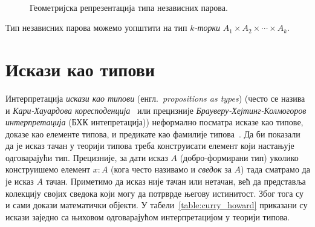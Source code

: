 \documentclass[12pt,oneside]{memoir}
\begin{document}
\begin{figure}[!ht]
    \centering\
    \label{fig:geo_prod}
    \caption{Геометријска репрезентација типа независних парова.}
\end{figure}

Тип независних парова можемо уопштити на тип \emph{$k$-торки} $A_1 \times A_2 \times \cdots \times A_k$.

\section{Искази као типови}
\label{sec:prop-as-types}

Интерпретација \emph{искази као типови} (енгл.~\emph{propositions as types}) (често се назива и \emph{Кари-Хауардова коресподенција}~\cite{how80} или прецизније \emph{Брауверу-Хејтинг-Колмогоров интерпретација} (БХК интепретација)) неформално посматра исказе као типове, доказе као елементе типова, и предикате као фамилије типова~\cite{wad15}. Да би показали да је исказ тачан у теорији типова треба конструисати елемент који настањује одговарајући тип. Прецизније, за дати исказ $A$ (добро-формирани тип) уколико конструишемо елемент $x : A$ (кога често називамо и \emph{сведок} за $A$) тада сматрамо да је исказ $A$ тачан. Приметимо да исказ није тачан или нетачан, већ да представља колекцију својих сведока који могу да потрврде његову истинитост. Због тога су и сами докази математички објекти. У табели~\ref{table:curry_howard} приказани су искази заједно са њиховом одговарајућом интерпретацијом у теорији типова.
\end{document}
